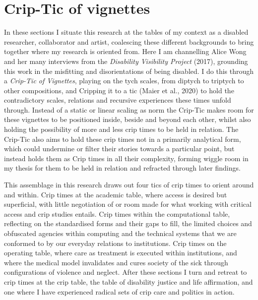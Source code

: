 \hypertarget{crip-tic-of-vignettes}{%
\section[Crip-Tic of
vignettes]{\texorpdfstring{\protect\hypertarget{anchor}{}{}Crip-Tic of
vignettes}{Crip-Tic of vignettes}}\label{crip-tic-of-vignettes}}

In these sections I situate this research at the tables of my context as
a disabled researcher, collaborator and artist, coalescing these
different backgrounds to bring together where my research is oriented
from. Here I am channelling Alice Wong and her many interviews from the
\emph{Disability Visibility Project} (2017), grounding this work in the
misfitting and disorientations of being disabled. I do this through a
\emph{Crip-Tic of Vignettes}, playing on the tych scales, from diptych
to triptych to other compositions, and Cripping it to a tic (Maier et
al., 2020) to hold the contradictory scales, relations and recursive
experiences these times unfold through. Instead of a static or linear
scaling as norm the Crip-Tic makes room for these vignettes to be
positioned inside, beside and beyond each other, whilst also holding the
possibility of more and less crip times to be held in relation. The
Crip-Tic also aims to hold these crip times not in a primarily
analytical form, which could undermine or filter their stories towards a
particular point, but instead holds them as Crip times in all their
complexity, forming wiggle room in my thesis for them to be held in
relation and refracted through later findings.

This assemblage in this research draws out four tics of crip times to
orient around and within. Crip times at the academic table, where access
is desired but superficial, with little negotiation of or room made for
what working with critical access and crip studies entails. Crip times
within the computational table, reflecting on the standardised forms and
their gaps to fill, the limited choices and obfuscated agencies within
computing and the technical systems that we are conformed to by our
everyday relations to institutions. Crip times on the operating table,
where care as treatment is executed within institutions, and where the
medical model invalidates and cures society of the sick through
configurations of violence and neglect. After these sections I turn and
retreat to crip times at the crip table, the table of disability justice
and life affirmation, and one where I have experienced radical sets of
crip care and politics in action.

